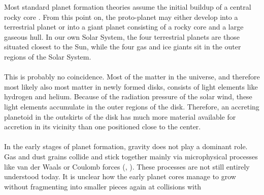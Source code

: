       Most standard planet formation theories assume the initial buildup of a 
      central rocky core \cite{Kley_1999}.
      From this point on, the proto-planet may either develop into a terrestrial 
      planet or into a giant planet consisting of a rocky core and a large 
      gaseous hull. In our own Solar System, the four terrestrial planets are 
      those situated closest to the Sun, while the four gas and ice giants sit 
      in the outer regions of the Solar System. \\
      \\
      This is probably no coincidence.
      Most of the matter in the universe, and therefore most likely also most 
      matter in 
      newly formed disks, consists of light elements like hydrogen and helium.
      Because of the radiation pressure of the solar wind, these light elements 
      accumulate in the outer regions of the disk. Therefore, an 
      accreting planetoid in the outskirts of the disk has much more material 
      available for accretion in its vicinity than one positioned close to the 
      center.
      \\
      \\
      In the early stages of planet formation, gravity does not play a dominant 
      role. Gas and dust grains collide and stick together mainly via 
      microphysical processes like van der Waals or Coulomb forces
      (\citeauthor{Ward_1996}, \citeyear{Ward_1996}).
      These processes are not still entirely understood today.
      It is unclear how the early planet cores manage to
      grow without fragmenting into smaller pieces again at collisions with 
